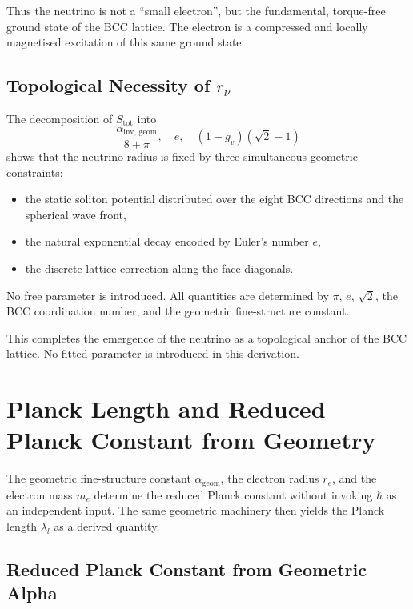 \documentclass[10pt,a4paper]{article}
\begin{document}
Thus the neutrino is not a “small electron”, but the fundamental, torque-free ground state of the BCC lattice. The electron is a compressed and locally magnetised excitation of this same ground state.

\subsection{Topological Necessity of \(r_\nu\)}
\label{sec:r_nu_necessity}

The decomposition of \(S_{\text{tot}}\) into
\begin{equation}
	\frac{\alpha_{\text{inv, geom}}}{8+\pi},\quad
	e,\quad
	(1-g_v)(\sqrt{2}-1)
\end{equation}
shows that the neutrino radius is fixed by three simultaneous geometric constraints:

\begin{itemize}
	\item the static soliton potential distributed over the eight BCC directions and the spherical wave front,
	\item the natural exponential decay encoded by Euler's number \(e\),
	\item the discrete lattice correction along the face diagonals.
\end{itemize}

No free parameter is introduced. All quantities are determined by \(\pi\), \(e\), \(\sqrt{2}\), the BCC coordination number, and the geometric fine-structure constant.

This completes the emergence of the neutrino as a topological anchor of the BCC lattice. No fitted parameter is introduced in this derivation.

\section{Planck Length and Reduced Planck Constant from Geometry}
\label{sec:planck_from_geometry}

The geometric fine-structure constant \(\alpha_{\text{geom}}\), the electron radius \(r_e\), and the electron mass \(m_e\) determine the reduced Planck constant without invoking \(\hbar\) as an independent input. The same geometric machinery then yields the Planck length \(\lambda_l\) as a derived quantity.

\subsection{Reduced Planck Constant from Geometric Alpha}
\label{sec:hbar_from_alpha}
\end{document}
